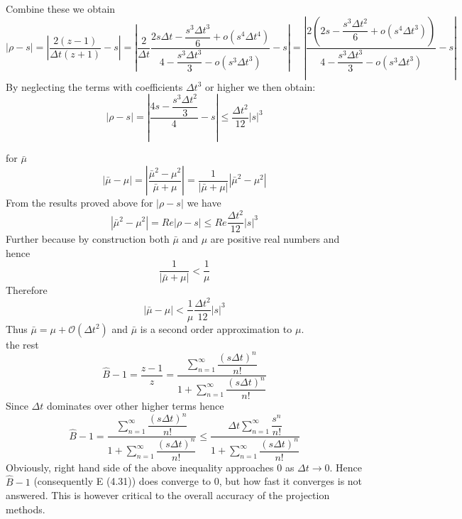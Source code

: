 Combine these we obtain
\begin{equation*}
| \rho - s | = | \dfrac{2 (z - 1)}{\Delta t (z + 1)} - s |
= | \dfrac{2}{\Delta t} \dfrac{2 s \Delta t - \dfrac{s^3 \Delta t^3}{6} + o(s^4 \Delta t^4)}{4 - \dfrac{s^3 \Delta t^3}{3} - o (s^3 \Delta t^3)} - s |
= | \dfrac{2 (2 s - \dfrac{s^3 \Delta t^2}{6} + o(s^4 \Delta t^3))}{4 - \dfrac{s^3 \Delta t^3}{3} - o (s^3 \Delta t^3)} - s |
\end{equation*}
By neglecting the terms with coefficients $\Delta t^3$ or higher we then obtain:
\begin{dmath}
| \rho - s | = | \dfrac{4 s - \dfrac{s^3 \Delta t^2}{3}}{4} - s | \leq \dfrac{\Delta t^2}{12} | s |^3
\end{dmath}


for $\bar{\mu}$
\begin{equation}
|\bar{\mu} - \mu| = | \dfrac{\bar{\mu}^2 - \mu^2}{\bar{\mu} + \mu} | = \dfrac{1}{| \bar{\mu} + \mu |} | \bar{\mu}^2 - \mu^2 |
\end{equation}
From the results proved above for $| \rho - s|$ we have
\begin{equation*}
|\bar{\mu}^2 - \mu^2 | = Re |\rho - s| \leq Re \dfrac{\Delta t^2}{12} | s |^3
\end{equation*}
Further because by construction both $\bar{\mu}$ and $\mu$ are positive real numbers and hence
\begin{equation*}
\dfrac{1}{| \bar{\mu} + \mu |} < \dfrac{1}{\mu}
\end{equation*}
Therefore
\begin{equation}
|\bar{\mu} - \mu| < \dfrac{1}{\mu} \dfrac{\Delta t^2}{12} | s |^3
\end{equation}
Thus $\bar{\mu} = \mu + \mathcal{O} (\Delta t^2)$ and $\bar{\mu}$ is a second order approximation to $\mu$.\\


the rest
\begin{dmath*}
\hat{B} - 1 = \dfrac{z - 1}{z}
= \dfrac{\sum_{n=1}^{\infty}\dfrac{(s \Delta t)^n}{n!}}{1+\sum_{n=1}^{\infty}\dfrac{(s \Delta t)^n}{n!}}
\end{dmath*}
Since $\Delta t$ dominates over other higher terms hence
\begin{equation}
\hat{B} - 1 = \dfrac{\sum_{n=1}^{\infty}\dfrac{(s \Delta t)^n}{n!}}{1+\sum_{n=1}^{\infty}\dfrac{(s \Delta t)^n}{n!}}
\leq \dfrac{\Delta t \sum_{n=1}^{\infty}\dfrac{s^n}{n!}}{1+\sum_{n=1}^{\infty}\dfrac{(s \Delta t)^n}{n!}}
\end{equation}
Obviously, right hand side of the above inequality approaches 0 as $\Delta t \rightarrow 0$. Hence $\hat{B} - 1$ (consequently E (4.31)) does converge to 0, but how fast it converges is not answered. This is however critical to the overall accuracy of the projection methods.\\

